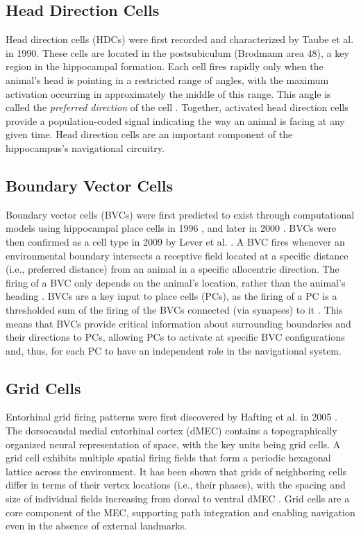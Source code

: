 \documentclass[conference]{IEEEtran}
\begin{document}
\subsection{Head Direction Cells}
Head direction cells (HDCs) were first recorded and characterized by Taube et al. in 1990. These cells are located in the postsubiculum (Brodmann area 48), a key region in the hippocampal formation. Each cell fires rapidly only when the animal's head is pointing in a restricted range of angles, with the maximum activation occurring in approximately the middle of this range. This angle is called the {\it preferred direction} of the cell \cite{taube1990headI}. Together, activated head direction cells provide a population-coded signal indicating the way an animal is facing at any given time. Head direction cells are an important component of the hippocampus's navigational circuitry.

\subsection{Boundary Vector Cells}
Boundary vector cells (BVCs) were first predicted to exist through computational models using hippocampal place cells in 1996 \cite{o1996geometric}, and later in 2000 \cite{hartley2000modeling, burgess2000predictions}. BVCs were then confirmed as a cell type in 2009 by Lever et al. \cite{lever2009boundary}. A BVC fires whenever an environmental boundary intersects a receptive field located at a specific distance (i.e., preferred distance) from an animal in a specific allocentric direction. The firing of a BVC only depends on the animal's location, rather than the animal's heading \cite{lever2009boundary}. BVCs are a key input to place cells (PCs), as the firing of a PC is a thresholded sum of the firing of the BVCs connected (via synapses) to it \cite{hartley2000modeling}. This means that BVCs provide critical information about surrounding boundaries and their directions to PCs, allowing PCs to activate at specific BVC configurations and, thus, for each PC to have an independent role in the navigational system.

\subsection{Grid Cells}
Entorhinal grid firing patterns were first discovered by Hafting et al. in 2005 \cite{hafting2005microstructure}. The dorsocaudal medial entorhinal cortex (dMEC) contains a topographically organized neural representation of space, with the key units being grid cells. A grid cell exhibits multiple spatial firing fields that form a periodic hexagonal lattice across the environment. It has been shown that grids of neighboring cells differ in terms of their vertex locations (i.e., their phases), with the spacing and size of individual fields increasing from dorsal to ventral dMEC \cite{hafting2005microstructure}. Grid cells are a core component of the MEC, supporting path integration and enabling navigation even in the absence of external landmarks.
\end{document}
